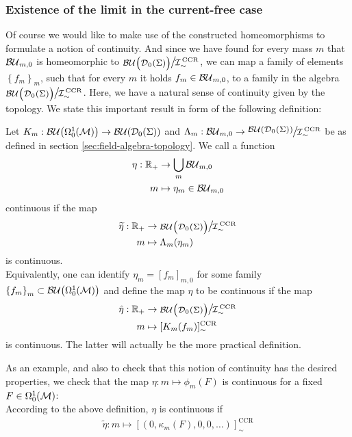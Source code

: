 \subsubsection{Existence of the limit in the current-free case}\label{sec:mass-dependence-j-zero}
Of course we would like to make use of the constructed homeomorphisms to formulate a notion of continuity. And since we have found for every mass $m$ that $\mathcal{BU}_{m,0}$ is homeomorphic to $\Quotientscale{\BU\big(\Dzs\big)}{\ICCR}$, we can map a family of elements $\left\{ f_m \right\}_m$, such that for every $m$ it holds $f_m \in \mathcal{BU}_{m,0}$, to a family in the algebra ${\Quotientscale{\BU\big(\Dzs\big)}{\ICCR}}$. Here, we have a natural sense of continuity given by the topology.
We state this important result in form of the following definition:
\begin{definition}\label{def:field_continuity}
	Let $K_m: {\mathcal{BU}\big(\Omega^1_0(\mathcal{M})\big)} \to \mathcal{BU}{\left( \mathcal{D}_{0}(\Sigma) \right)}$ and $\Lambda_m : \BUmz \to {\Quotientscale{\BU{\left( \Dzs \right)}}{\ICCR}}$ be as defined in section \ref{sec:field-algebra-topology}. We call a function
	\begin{align}
	\eta : \mathbb{R}_+ &\to \bigcup_m \mathcal{BU}_{m,0}\\
	m &\mapsto \eta_m  \in \mathcal{BU}_{m,0} \notag
	\end{align}
	continuous if the map
	\begin{align}
	\widetilde{\eta} : \IR_+ &\to {\Quotientscale{\BU\big( \Dzs \big) }{\ICCR}} \\
	m &\mapsto \Lambda_m (\eta_m)\notag
	\end{align}
	is continuous.\\
	Equivalently, one can identify $\eta_m = [f_m]_{m,0}$ for some family $\left\{ f_m \right\}_m \subset {\mathcal{BU}\big(\Omega^1_0(\ensuremath{\mathcal{M}})\big)}$ and define the map $\eta$ to be continuous if the map
	\begin{align}
	\hat{\eta} : \IR_+ &\to {\Quotientscale{\BU\big( \Dzs \big) }{\ICCR}} \\
	m &\mapsto [K_m(f_m)]_\sim^\text{CCR}\notag
	\end{align}
	 is continuous. The latter will actually be the more practical definition.
\end{definition}
As an example, and also to check that this notion of continuity has the desired properties, we check that the map $\eta: m \mapsto \phi_m(F)$ is continuous for a fixed $F \in \Omega^1_0(\mathcal{M})$:\\
According to the above definition, $\eta$ is continuous if
\begin{align}
\widetilde{\eta}: m \mapsto [(0, \kappa_m (F), 0, 0, \dots)]^\text{CCR}_\sim
\end{align}
